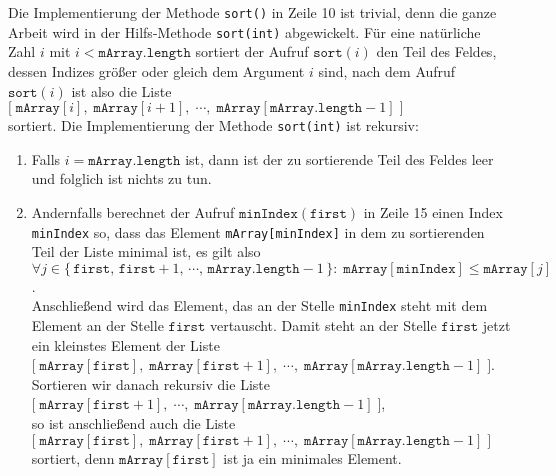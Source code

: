 Die Implementierung der Methode \texttt{sort()} in Zeile 10 ist trivial, denn die ganze
Arbeit wird in der Hilfs-Methode \texttt{sort(int)} abgewickelt.  F\"ur eine 
nat\"urliche Zahl $i$ mit $i < \mathtt{mArray.length}$ sortiert der Aufruf 
 $\texttt{sort}(i)$ 
den Teil des Feldes, dessen Indizes gr\"o{\ss}er oder gleich dem Argument $i$ sind, nach dem
Aufruf $\mathtt{sort}(i)$ ist also die Liste \\[0.2cm]
\hspace*{1.3cm} 
$\bigl[\;\mathtt{mArray}[i],\;\mathtt{mArray}[i+1],\;\cdots,\;\mathtt{mArray}[\mathtt{mArray.length}-1] \;\bigr]$
\\[0.2cm]
sortiert.  Die Implementierung der Methode \texttt{sort(int)} ist rekursiv:
\begin{enumerate}
\item Falls $i = \mathtt{mArray.length}$ ist, dann ist der zu sortierende Teil des 
      Feldes leer und folglich ist nichts zu tun.
\item Andernfalls berechnet der Aufruf $\texttt{minIndex}(\mathtt{first})$ in Zeile 15 einen Index
      \texttt{minIndex} so, dass das Element \texttt{mArray[minIndex]} in dem zu
      sortierenden Teil der Liste minimal ist, es gilt also \\[0.2cm]
      \hspace*{1.3cm} 
      $\forall j \in \bigl\{\, \mathtt{first},\, \mathtt{first}+1,\, \cdots,\, \texttt{mArray.length} -1\, \} \colon\;
       \texttt{mArray}[\texttt{minIndex}] \leq \texttt{mArray}[j]$. \\[0.2cm]
      Anschlie{\ss}end wird das Element, das an der Stelle \texttt{minIndex} steht mit dem
      Element an der Stelle $\texttt{first}$ vertauscht.  Damit steht an der Stelle $\texttt{first}$ jetzt ein
      kleinstes Element der Liste \\[0.2cm]
      \hspace*{1.3cm} $\bigl[\;\mathtt{mArray}[\texttt{first}],\;\mathtt{mArray}[\texttt{first}+1],\;\cdots,\;\mathtt{mArray}[\mathtt{mArray.length}-1] \;\bigr]$.
      \\[0.2cm]
      Sortieren wir danach rekursiv die Liste \\[0.2cm]
      \hspace*{1.3cm} $\bigl[\;\mathtt{mArray}[\texttt{first}+1],\;\cdots,\;\mathtt{mArray}[\mathtt{mArray.length}-1] \;\bigr]$,
      \\[0.2cm]
      so ist anschlie{\ss}end auch die Liste \\[0.2cm]
      \hspace*{1.3cm}
      $\bigl[\;\mathtt{mArray}[\texttt{first}],\;\mathtt{mArray}[\texttt{first}+1],\;\cdots,\;\mathtt{mArray}[\mathtt{mArray.length}-1] \;\bigr]$
      \\[0.2cm]
      sortiert, denn $\texttt{mArray}[\texttt{first}]$ ist ja ein minimales Element.
\end{enumerate}
